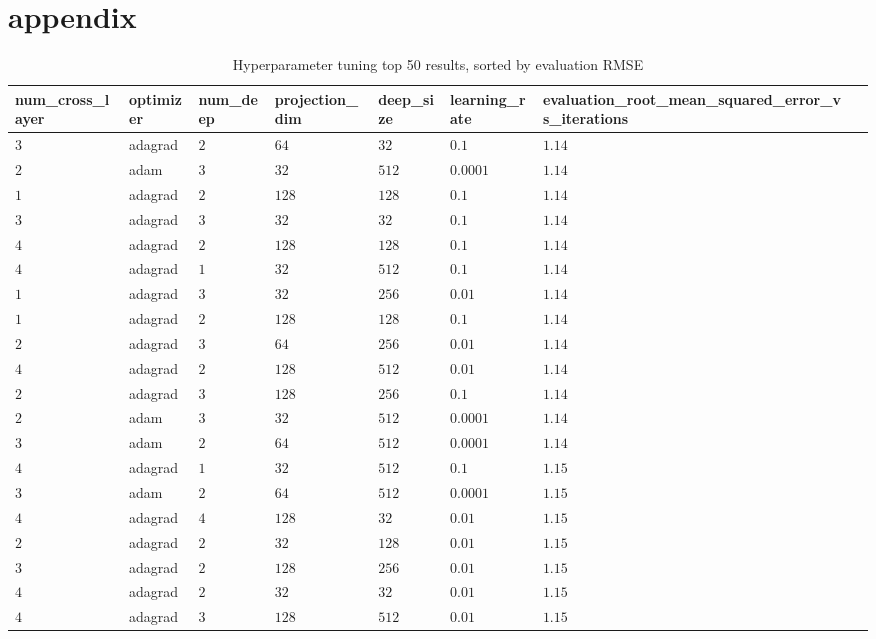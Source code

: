 \section*{appendix}
\begin{table}[hb]
    \centering
    \caption{Hyperparameter tuning top 50 results, sorted by evaluation RMSE}
    \label{tab:hyp_table}    
    \begin{tabular}{llllllll}
    \toprule
    num\_cross\_layer & optimizer & num\_deep & projection\_dim & deep\_size & learning\_rate & evaluation\_root\_mean\_squared\_error\_vs\_iterations \\ \midrule
    $3$ & adagrad & $2$ & $64$ & $32$ & $0.1$ & $1.14$ \\
    $2$ & adam & $3$ & $32$ & $512$ & $0.0001$ & $1.14$ \\
    $1$ & adagrad & $2$ & $128$ & $128$ & $0.1$ & $1.14$ \\
    $3$ & adagrad & $3$ & $32$ & $32$ & $0.1$ & $1.14$ \\
    $4$ & adagrad & $2$ & $128$ & $128$ & $0.1$ & $1.14$ \\
    $4$ & adagrad & $1$ & $32$ & $512$ & $0.1$ & $1.14$ \\
    $1$ & adagrad & $3$ & $32$ & $256$ & $0.01$ & $1.14$ \\
    $1$ & adagrad & $2$ & $128$ & $128$ & $0.1$ & $1.14$ \\
    $2$ & adagrad & $3$ & $64$ & $256$ & $0.01$ & $1.14$ \\
    $4$ & adagrad & $2$ & $128$ & $512$ & $0.01$ & $1.14$ \\
    $2$ & adagrad & $3$ & $128$ & $256$ & $0.1$ & $1.14$ \\
    $2$ & adam & $3$ & $32$ & $512$ & $0.0001$ & $1.14$ \\
    $3$ & adam & $2$ & $64$ & $512$ & $0.0001$ & $1.14$ \\
    $4$ & adagrad & $1$ & $32$ & $512$ & $0.1$ & $1.15$ \\
    $3$ & adam & $2$ & $64$ & $512$ & $0.0001$ & $1.15$ \\
    $4$ & adagrad & $4$ & $128$ & $32$ & $0.01$ & $1.15$ \\
    $2$ & adagrad & $2$ & $32$ & $128$ & $0.01$ & $1.15$ \\
    $3$ & adagrad & $2$ & $128$ & $256$ & $0.01$ & $1.15$ \\
    $4$ & adagrad & $2$ & $32$ & $32$ & $0.01$ & $1.15$ \\
    $4$ & adagrad & $3$ & $128$ & $512$ & $0.01$ & $1.15$ \\

\end{tabular}
\end{table}

